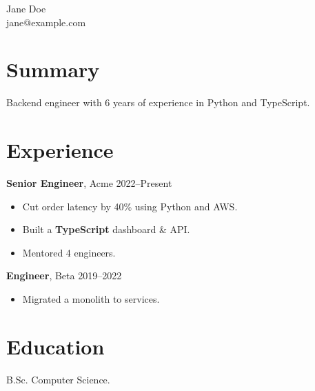 \documentclass{article}
\begin{document}
\begin{center}{\Large Jane Doe}\\ jane@example.com\end{center}

\section{Summary}
Backend engineer with 6 years of experience in Python and TypeScript.

\section{Experience}
\textbf{Senior Engineer}, Acme \hfill 2022--Present
\begin{itemize}
\item Cut order latency by 40\% using Python and AWS.
\item Built a \textbf{TypeScript} dashboard & API.
\item Mentored 4 engineers.
\end{itemize}
\textbf{Engineer}, Beta \hfill 2019--2022
\begin{itemize}
\item Migrated a monolith to services.
\end{itemize}

\section{Education}
B.Sc. Computer Science.
\end{document}
